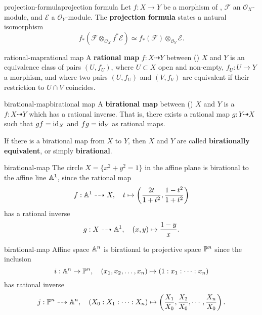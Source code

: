 \begin{topic}{projection-formula}{projection formula}
    Let $f : X \to Y$ be a morphism of , $\mathcal{F}$ an $\mathcal{O}_X$-module, and $\mathcal{E}$ a  $\mathcal{O}_Y$-module. The \textbf{projection formula} states a natural isomorphism
    \[ f_*\left(\mathcal{F} \otimes_{\mathcal{O}_X} f^* \mathcal{E} \right) \simeq f_*\left(\mathcal{F}\right) \otimes_{\mathcal{O}_Y} \mathcal{E} . \]
\end{topic}

\begin{topic}{rational-map}{rational map}
    A \textbf{rational map} $f : X \dashrightarrow Y$ between ()  $X$ and $Y$ is an equivalence class of pairs $(U, f_U)$, where $U \subset X$ open and non-empty, $f_U : U \to Y$ a morphism, and where two pairs $(U, f_U)$ and $(V, f_V)$ are equivalent if their restriction to $U \cap V$ coincides.
\end{topic}

\begin{topic}{birational-map}{birational map}
    A \textbf{birational map} between ()  $X$ and $Y$ is a  $f : X \dashrightarrow Y$ which has a rational inverse. That is, there exists a rational map $g : Y \dashrightarrow X$ such that $gf = \id_X$ and $fg = \id_Y$ as rational maps.
    
    If there is a birational map from $X$ to $Y$, then $X$ and $Y$ are called \textbf{birationally equivalent}, or simply \textbf{birational}.
\end{topic}

\begin{example}{birational-map}
    The circle $X = \{ x^2 + y^2 = 1 \}$ in the affine plane is birational to the affine line $\AA^1$, since the rational map
    \[ f : \AA^1 \dashrightarrow X, \quad t \mapsto \left(\frac{2t}{1 + t^2}, \frac{1 - t^2}{1 + t^2}\right) \]
    has a rational inverse
    \[ g : X \dashrightarrow \AA^1, \quad (x, y) \mapsto \frac{1 - y}{x} . \]
\end{example}

\begin{example}{birational-map}
    Affine space $\AA^n$ is birational to projective space $\PP^n$ since the inclusion
    \[ i : \AA^n \to \PP^n, \quad (x_1, x_2, \ldots, x_n) \mapsto (1 : x_1 : \cdots : x_n) \]
    has rational inverse
    \[ j : \PP^n \dashrightarrow \AA^n, \quad (X_0 : X_1 : \cdots : X_n) \mapsto \left(\frac{X_1}{X_0}, \frac{X_2}{X_0}, \cdots, \frac{X_n}{X_0}\right) . \]
\end{example}

